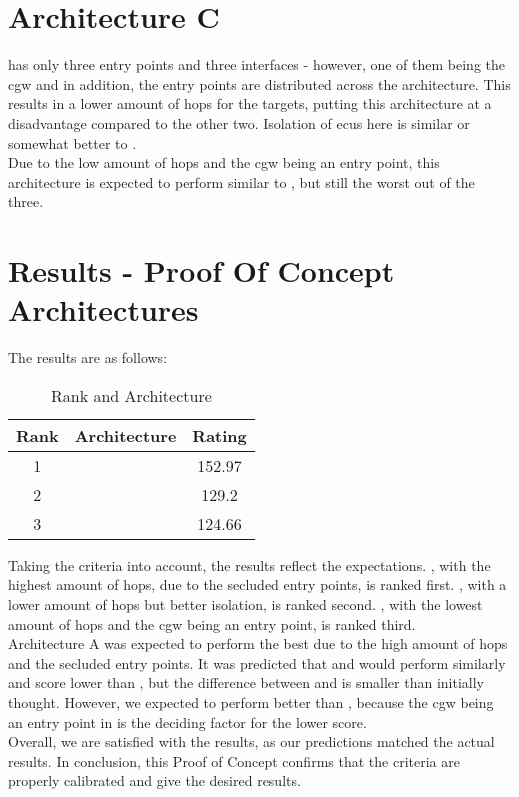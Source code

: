 \section{Architecture C}
\label{sec:archc}

 has only three entry points and three interfaces - however, one of them being the \acrshort{cgw} and 
in addition, the entry points are distributed across the architecture. 
This results in a lower amount of hops for the targets, putting this architecture at a disadvantage compared to the other two.
Isolation of \acrshort{ecu}s here is similar or somewhat better to .\\
Due to the low amount of hops and the \acrshort{cgw} being an entry point, this architecture is expected to perform 
similar to , but still the worst out of the three.


\section{Results - Proof Of Concept Architectures}
\label{sec:resultsproof}

The results are as follows:

\begin{table}[h]
    \label{table:survey}
    \centering
    \caption{Rank and Architecture}
    \begin{tabular}{ |c|c|c| } 
    \hline
    Rank & Architecture & Rating\\
    \hline
    1 & \nameref{fig:architectureA} & 152.97\\ 
    2 & \nameref{fig:architectureB} & 129.2\\
    3 & \nameref{fig:architectureC} & 124.66\\
    \hline
    \end{tabular}
\end{table}

Taking the criteria into account, the results reflect the expectations.
, with the highest amount of hops, due to the secluded entry points, is ranked first.
, with a lower amount of hops but better isolation, is ranked second.
, with the lowest amount of hops and the \acrshort{cgw} being an entry point, is ranked third.\\

Architecture A was expected to perform the best due to the high amount of hops and the secluded entry points.
It was predicted that  and  would perform similarly and score lower than ,
but the difference between  and  is smaller than initially thought. 
However, we expected  to perform better than , 
because the \acrshort{cgw} being an entry point in  is the deciding factor for the lower score.\\

Overall, we are satisfied with the results, as our predictions matched the actual results.
In conclusion, this Proof of Concept confirms that the criteria are properly calibrated and give the desired results.